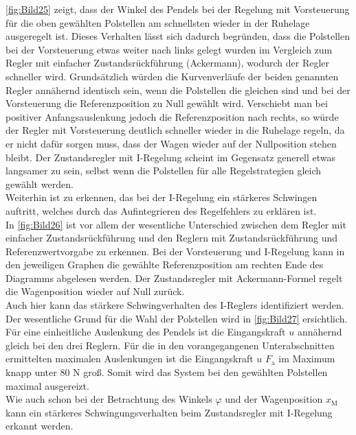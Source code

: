 \autoref{fig:Bild25} zeigt, dass der Winkel des Pendels bei der Regelung mit Vorsteuerung für die oben gewählten Polstellen am schnellsten wieder in der Ruhelage ausgeregelt ist. Dieses Verhalten lässt sich dadurch begründen, dass die Polstellen bei der Vorsteuerung etwas weiter nach links gelegt wurden im Vergleich zum Regler mit einfacher Zustandsrückführung (Ackermann), wodurch der Regler schneller wird. Grundsätzlich würden die Kurvenverläufe der beiden genannten Regler annähernd identisch sein, wenn die Polstellen die gleichen sind und bei der Vorsteuerung die Referenzposition zu Null gewählt wird. Verschiebt man bei positiver Anfangsauslenkung jedoch die Referenzposition nach rechts, so würde der Regler mit Vorsteuerung deutlich schneller wieder in die Ruhelage regeln, da er nicht dafür sorgen muss, dass der Wagen wieder auf der Nullposition stehen bleibt. Der Zustandsregler mit I-Regelung scheint im Gegensatz generell etwas langsamer zu sein, selbst wenn die Polstellen für alle Regelstrategien gleich gewählt werden. \\
Weiterhin ist zu erkennen, das bei der I-Regelung ein stärkeres Schwingen auftritt, welches durch das Aufintegrieren des Regelfehlers zu erklären ist. \\
\newline
In \autoref{fig:Bild26} ist vor allem der wesentliche Unterschied zwischen dem Regler mit einfacher Zustandsrückführung und den Reglern mit Zustandsrückführung und Referenzwertvorgabe zu erkennen. Bei der Vorsteuerung und I-Regelung kann in den jeweiligen Graphen die gewählte Referenzposition am rechten Ende des Diagramms abgelesen werden. Der Zustandsregler mit Ackermann-Formel regelt die Wagenposition wieder auf Null zurück. \\
Auch hier kann das stärkere Schwingverhalten des I-Reglers identifiziert werden. \\
\newline
Der wesentliche Grund für die Wahl der Polstellen wird in \autoref{fig:Bild27} ersichtlich. Für eine einheitliche Auslenkung des Pendels ist die Eingangskraft $u$ annähernd gleich bei den drei Reglern. Für die in den vorangegangenen Unterabschnitten ermittelten maximalen Auslenkungen ist die Eingangskraft $u$ \bzw $F_{\mathrm{a}}$ im Maximum knapp unter 80 N groß. Somit wird das System bei den gewählten Polstellen maximal ausgereizt. \\
Wie auch schon bei der Betrachtung des Winkels $\varphi$ und der Wagenposition $x_{\mathrm{M}}$ kann ein stärkeres Schwingungsverhalten beim Zustandsregler mit I-Regelung erkannt werden.

